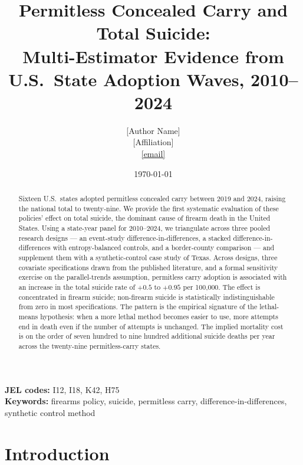 \documentclass[12pt]{article}
\title{
  Permitless Concealed Carry and Total Suicide: \\
  \large Multi-Estimator Evidence from U.S.\ State Adoption Waves, 2010--2024
}
\author{
  [Author Name] \\
  \small [Affiliation] \\
  \small \href{mailto:[email]}{[email]}
}
\date{\today}
\begin{document}
\maketitle

\begin{abstract}
\noindent
Sixteen U.S.\ states adopted permitless concealed carry between
2019 and 2024, raising the national total to twenty-nine. We
provide the first systematic evaluation of these policies' effect
on total suicide, the dominant cause of firearm death in the
United States. Using a state-year panel for 2010--2024, we
triangulate across three pooled research designs --- an event-study
difference-in-differences, a stacked difference-in-differences with
entropy-balanced controls, and a border-county comparison --- and
supplement them with a synthetic-control case study of Texas. Across
designs, three covariate specifications drawn from the published
literature, and a formal sensitivity exercise on the parallel-trends
assumption, permitless carry adoption is associated with an increase
in the total suicide rate of $+0.5$ to $+0.95$ per 100,000. The
effect is concentrated in firearm suicide; non-firearm suicide is
statistically indistinguishable from zero in most specifications.
The pattern is the empirical signature of the lethal-means
hypothesis: when a more lethal method becomes easier to use, more
attempts end in death even if the number of attempts is unchanged.
The implied mortality cost is on the order of seven hundred to nine
hundred additional suicide deaths per year across the twenty-nine
permitless-carry states.
\end{abstract}

\medskip
\noindent\textbf{JEL codes:} I12, I18, K42, H75 \\
\textbf{Keywords:} firearms policy, suicide, permitless carry, difference-in-differences, synthetic control method


\section{Introduction}\label{sec:intro}
\end{document}
